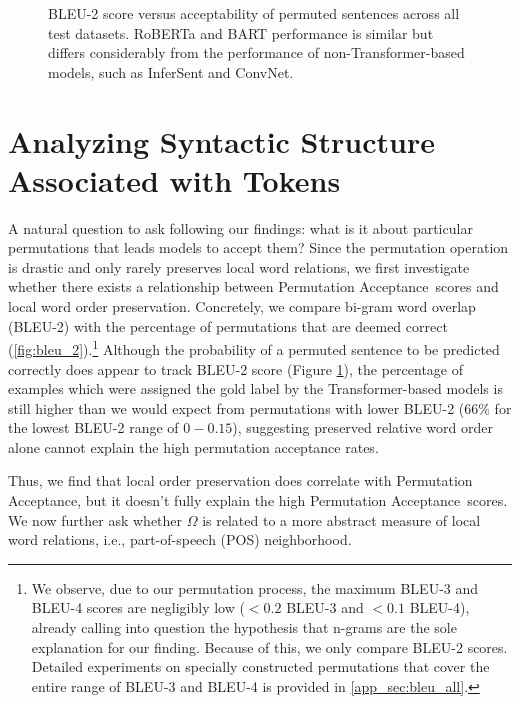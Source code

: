 \documentclass[11pt,a4paper]{article}
\newcommand{\PermAcc}{Permutation Acceptance} %
\begin{document}
\begin{figure}[t]
    \centering
    \caption{BLEU-2 score versus acceptability of permuted sentences across all test datasets. RoBERTa and BART performance is similar but differs considerably from the performance of non-Transformer-based models, such as InferSent and ConvNet. }
    \label{fig:bleu_2}
\end{figure}

\section{Analyzing Syntactic Structure Associated with Tokens}\label{sec:pos_mini_tree}

A natural question to ask following our findings: what is it about particular permutations that leads models to accept them? Since the permutation operation is drastic and only rarely preserves local word relations, we first investigate whether there exists a relationship between \PermAcc\ scores and local word order preservation. Concretely, we compare bi-gram word overlap (BLEU-2) with the percentage of permutations that are deemed correct (\autoref{fig:bleu_2}).\footnote{We observe, due to our permutation process, the maximum BLEU-3 and BLEU-4 scores are negligibly low ($< 0.2$  BLEU-3 and $< 0.1$ BLEU-4), already calling into question the hypothesis that n-grams are the sole explanation for our finding. Because of this, we only compare BLEU-2 scores. Detailed experiments on specially constructed permutations that cover the entire range of BLEU-3 and BLEU-4 is provided in \autoref{app_sec:bleu_all}.} Although the probability of a permuted sentence to be predicted correctly does appear to track BLEU-2 score (Figure \ref{fig:bleu_2}), the percentage of examples which were assigned the gold label by the Transformer-based models is still higher than we would expect from permutations with lower BLEU-2 (66\% for the lowest BLEU-2 range of $0-0.15$), suggesting preserved relative word order alone cannot explain the high permutation acceptance rates.

Thus, we find that local order preservation does correlate with \PermAcc, but it doesn't fully explain the high \PermAcc\ scores.
We now further ask whether $\Omega$ is related to a more abstract measure of local word relations, i.e., part-of-speech (POS) neighborhood.
\end{document}
